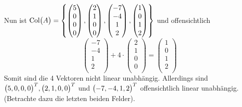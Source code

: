 \documentclass{scrreprt}
\begin{document}
\begin{enumerate}[(a)]
  Nun ist $\text{Col}\qty\big(A) = \qty{
    \begin{pmatrix}
      5 \\
      0 \\
      0 \\
      0 \\
    \end{pmatrix},
    \begin{pmatrix}
      2 \\
      1 \\
      0 \\
      0 \\
    \end{pmatrix},
    \begin{pmatrix}
      -7 \\
      -4 \\
      1  \\
      2  \\
    \end{pmatrix},
    \begin{pmatrix}
      1 \\
      0 \\
      1 \\
      2 \\
    \end{pmatrix}
  }$ und offensichtlich
  \[
    \begin{pmatrix}
      -7 \\
      -4 \\
      1  \\
      2  \\
    \end{pmatrix} + 4 \cdot \begin{pmatrix}
      2 \\
      1 \\
      0 \\
      0 \\
    \end{pmatrix} = \begin{pmatrix}
      1 \\
      0 \\
      1 \\
      2 \\
    \end{pmatrix}
  \]
  Somit sind die 4 Vektoren nicht linear unabhängig.
  Allerdings sind $\qty\big(5, 0, 0, 0)^T, \qty\big(2, 1, 0, 0)^T$ und
  $\qty\big(-7, -4, 1, 2)^T$ offensichtlich linear unabhängig.
  (Betrachte dazu die letzten beiden Felder).


\end{enumerate}
\end{document}
